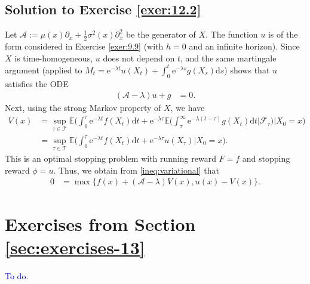 \documentclass[12pt]{book}
\let\varphi\phi
\numberwithin{equation}{chapter}
\theoremstyle{plain}
\numberwithin{theorem}{section}
\theoremstyle{definition}
\numberwithin{exercise}{chapter}
\newcommand{\<}{\langle}
\renewcommand{\>}{\rangle}
\renewcommand{\(}{\left(}
\renewcommand{\)}{\right)}
\renewcommand{\[}{\left[}
\renewcommand{\]}{\right]}
\newcommand\Eb{\mathds{E}}
\newcommand\Ac{\mathscr{A}}
\newcommand\Fc{\mathscr{F}}
\newcommand\Tc{\mathscr{T}}
\newcommand\sig{\sigma}
\newcommand\lam{\lambda}
\renewcommand\d{\partial}
\newcommand\dd{\mathrm{d}}
\newcommand\ee{\mathrm{e}}
\newcommand{\blu}[1]{\textcolor{blue}{#1}}
\begin{document}
\subsection*{Solution to Exercise \ref{exer:12.2}}
Let $\Ac := \mu(x) \d_x + \tfrac{1}{2} \sig^2(x) \d_x^2$ be the generator of $X$.  The function $u$ is of the form considered in Exercise \ref{exer:9.9} (with $h = 0$ and an infinite horizon).  Since $X$ is time-homogeneous, $u$ does not depend on $t$, and the same martingale argument (applied to $M_t = \ee^{-\lam t} u(X_t) + \int_0^t \ee^{-\lam s} g(X_s) \dd s$) shows that $u$ satisfies the ODE
\begin{align}
(\Ac - \lam) u + g
	&=	0 .
\end{align}
Next, using the strong Markov property of $X$, we have
\begin{align}
V(x)
	&=	\sup_{\tau \in \Tc} \Eb \Big( \int_0^\tau \ee^{- \lam t} f(X_t) \dd t
			+ \ee^{- \lam \tau} \Eb \Big( \int_\tau^\infty \ee^{- \lam (t-\tau)} g(X_t) \dd t \Big| \Fc_\tau \Big)  \Big| X_0 = x  \Big) \\
	&=	\sup_{\tau \in \Tc} \Eb \Big( \int_0^\tau \ee^{- \lam t} f(X_t) \dd t + \ee^{- \lam \tau} u(X_\tau) \Big| X_0 = x \Big) .
\end{align}
This is an optimal stopping problem with running reward $F = f$ and stopping reward $\varphi = u$.  Thus, we obtain from \eqref{ineq:variational} that
\begin{align}
0
	&=	\max\{ f(x) + (\Ac - \lam ) V(x) , u(x) - V(x) \} .
\end{align}


\section{Exercises from Section \ref{sec:exercises-13}}
\blu{To do.}
\end{document}
